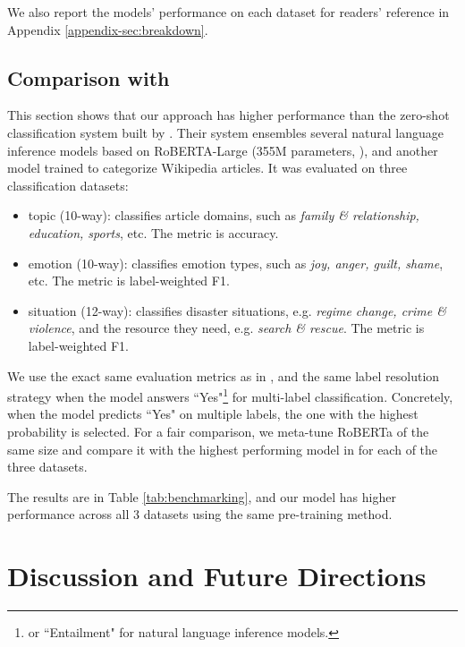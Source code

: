 We also report the models' performance on each dataset for readers' reference in Appendix \ref{appendix-sec:breakdown}.

\subsection{Comparison with \citet{yin-etal-2019-benchmarking}} \label{sec:comparison}

This section shows that our approach has higher performance than the zero-shot classification system built by \citet{yin-etal-2019-benchmarking}.
Their system ensembles several natural language inference models based on RoBERTA-Large (355M parameters, \citet{liu2020roberta}), and another model trained to categorize Wikipedia articles. It was evaluated on three classification datasets:

\begin{itemize}
    \item topic (10-way): classifies article domains, such as \textit{family \& relationship, education, sports}, etc. The metric is accuracy. 
    \item emotion (10-way): classifies emotion types, such as \textit{joy, anger, guilt, shame}, etc. The metric is label-weighted F1.
    \item situation (12-way): classifies disaster situations, e.g. \textit{regime change, crime \& violence}, and the resource they need, e.g. \textit{search \& rescue}. The metric is label-weighted F1.
\end{itemize}

We use the exact same evaluation metrics as in \citet{yin-etal-2019-benchmarking}, and the same label resolution strategy when the model answers ``Yes"\footnote{or ``Entailment" for natural language inference models.} for multi-label classification. Concretely, when the model predicts ``Yes" on multiple labels, the one with the highest probability is selected. For a fair comparison, we meta-tune RoBERTa of the same size and compare it with the highest performing model in \citet{yin-etal-2019-benchmarking} for each of the three datasets.

The results are in Table \ref{tab:benchmarking}, and our model has higher performance across all 3 datasets using the same pre-training method.

\section{Discussion and Future Directions} \label{sec:implications}

